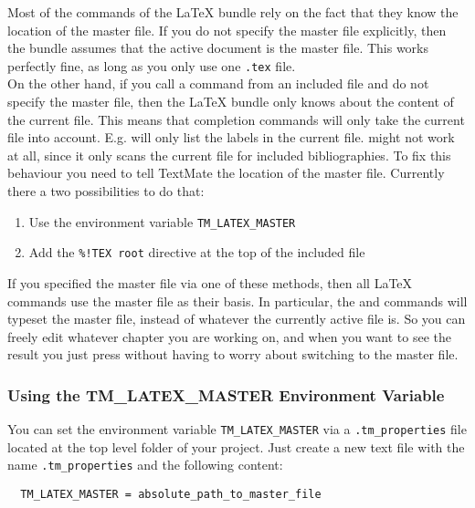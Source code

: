 \documentclass[11pt, x11names]{article}
\begin{document}
Most of the commands of the LaTeX bundle rely on the fact that they know the location of the master file. If you do not specify the master file explicitly, then the bundle assumes that the active document is the master file. This works perfectly fine, as long as you only use one \texttt{.tex} file.\\

On the other hand, if you call a command from an included file and do not specify the master file, then the LaTeX bundle only knows about the content of the current file. This means that completion commands will only take the current file into account. E.g.  will only list the labels in the current file.  might not work at all, since it only scans the current file for included bibliographies. To fix this behaviour you need to tell TextMate the location of the master file. Currently there a two possibilities to do that:

\begin{enumerate}
  \item Use the environment variable \texttt{TM\_LATEX\_MASTER}
  \item Add the \texttt{\%!TEX\ root} directive at the top of the included file
\end{enumerate}

If you specified the master file via one of these methods, then all LaTeX commands use the master file as their basis. In particular, the  and  commands will typeset the master file, instead of whatever the currently active file is. So you can freely edit whatever chapter you are working on, and when you want to see the result you just press  without having to worry about switching to the master file.

\subsubsection{Using the TM\_LATEX\_MASTER Environment Variable}
\label{sec:Using_TM_LATEX_MASTER}

You can set the environment variable \texttt{TM\_LATEX\_MASTER} via a \texttt{.tm\_properties} file located at the top level folder of your project. Just create a new text file with the name \texttt{.tm\_properties} and the following content:

\begin{verbatim}
  TM_LATEX_MASTER = absolute_path_to_master_file
\end{verbatim}
\end{document}
